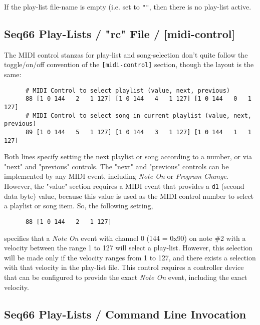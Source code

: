    If the play-list file-name is empty (i.e. set to \texttt{""}, then there is
   no play-list active.

\subsection{Seq66 Play-Lists / "rc" File / [midi-control]}
\label{subsec:playlist_rc_file_midi_ctrl}

   The MIDI control stanzas for play-list and song-selection don't quite follow
   the toggle/on/off convention of the \texttt{[midi-control]} section, though
   the layout is the same:

   \begin{verbatim}
      # MIDI Control to select playlist (value, next, previous)
      88 [1 0 144   2   1 127] [1 0 144   4   1 127] [1 0 144   0   1 127]
      # MIDI Control to select song in current playlist (value, next, previous)
      89 [1 0 144   5   1 127] [1 0 144   3   1 127] [1 0 144   1   1 127]
   \end{verbatim}

   Both lines specify setting the next playlist or song according to a number,
   or via "next" and "previous" controls.  The "next" and "previous" controls
   can be implemented by any MIDI event, including \textsl{Note On} or
   \textsl{Program Change}.  However, the "value" section requires a MIDI event
   that provides a \texttt{d1} (second data byte) value, because this value is
   used as the MIDI control number to select a playlist or song item.
   So, the following setting,

   \begin{verbatim}
      88 [1 0 144   2   1 127]
   \end{verbatim}

   specifies that a \textsl{Note On} event with channel 0 (144 = 0x90) on note
   \#2 with a velocity between the range 1 to 127 will select a play-list.
   However, this selection will be made only if the velocity ranges from 1 to
   127, and there exists a selection with that velocity in the play-list file.
   This control requires a controller device that can be configured to provide
   the exact \textsl{Note On} event, including the exact velocity.

\subsection{Seq66 Play-Lists / Command Line Invocation}
\label{subsec:playlist_cmd_line}

